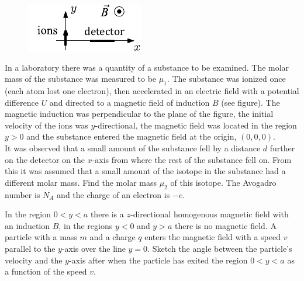 \documentclass[11pt]{article}
\begin{document}
\probeng
\begin{figure}%
\includegraphics[width=\linewidth]{2013-v2g-10-massspektromeeter_ipe_ing}%
\end{figure}
In a laboratory there was a quantity of a substance to be examined. The molar mass of the substance was measured to be $\mu_{1}$. The substance was ionized once (each atom lost one electron), then accelerated in an electric field with a potential difference $U$ and directed to a magnetic field of induction $B$ (see figure). The magnetic induction was perpendicular to the plane of the figure, the initial velocity of the ions was $y$-directional, the magnetic field was located in the region $y>0$ and the substance entered the magnetic field at the origin, $(0, 0, 0)$.\\
It was observed that a small amount of the substance fell by a distance $d$ further on the detector on the $x$-axis from where the rest of the substance fell on. From this it was assumed that a small amount of the isotope in the substance had a different molar mass. Find the molar mass $\mu_{2}$ of this isotope. The Avogadro number is $N_A$ and the charge of an electron is $-e$.
\probend
\bigskip


\probeng
In the region $0<y<a$ there is a $z$-directional homogenous magnetic field with an induction $B$, in the regions $y<0$ and $y>a$ there is no magnetic field. A particle with a mass $m$ and a charge $q$ enters the magnetic field with a speed $v$ parallel to the $y$-axis over the line $y=0$. Sketch the angle between the particle’s velocity and the $y$-axis after when the particle has exited the region $0<y<a$ as a function of the speed $v$.
\probend
\bigskip

\end{document}
